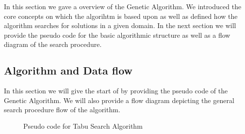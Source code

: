 In this section we gave a overview of the Genetic Algorithm. We introduced the core concepts on which the algorihtm is based upon as well as defined how the algorithm searches for solutions in a given domain. In the next section we will provide the pseudo code for the basic algorithmic structure as well as a flow diagram of the search procedure.
\subsection{Algorithm and Data flow}
In this section we will give the start of by providing the pseudo code of the Genetic Algorithm. We will also provide a flow diagram depicting the general search procedure flow of the algorithm. 
\begin{figure}[h]
	\centering
	\setlength \fboxsep{0pt}
	\setlength \fboxrule{0.5pt}
	\caption{Pseudo code for Tabu Search Algorithm}
	\label{fig:GAlgorithmPseudoCode}
\end{figure}
